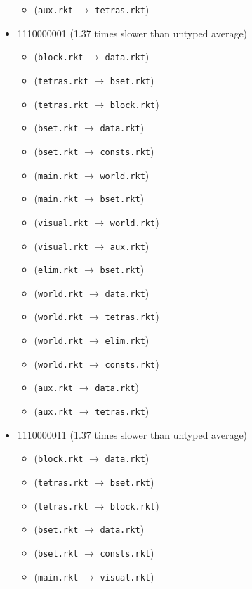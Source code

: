 \documentclass{article}
\newcommand{\mono}[1]{\texttt{#1}}
\begin{document}
\begin{itemize}
\begin{itemize}
  \item (\mono{aux.rkt} $\rightarrow$ \mono{tetras.rkt})
  \end{itemize}
\item 1110000001 (1.37 times slower than untyped average)
  \begin{itemize}
  \item (\mono{block.rkt} $\rightarrow$ \mono{data.rkt})
  \item (\mono{tetras.rkt} $\rightarrow$ \mono{bset.rkt})
  \item (\mono{tetras.rkt} $\rightarrow$ \mono{block.rkt})
  \item (\mono{bset.rkt} $\rightarrow$ \mono{data.rkt})
  \item (\mono{bset.rkt} $\rightarrow$ \mono{consts.rkt})
  \item (\mono{main.rkt} $\rightarrow$ \mono{world.rkt})
  \item (\mono{main.rkt} $\rightarrow$ \mono{bset.rkt})
  \item (\mono{visual.rkt} $\rightarrow$ \mono{world.rkt})
  \item (\mono{visual.rkt} $\rightarrow$ \mono{aux.rkt})
  \item (\mono{elim.rkt} $\rightarrow$ \mono{bset.rkt})
  \item (\mono{world.rkt} $\rightarrow$ \mono{data.rkt})
  \item (\mono{world.rkt} $\rightarrow$ \mono{tetras.rkt})
  \item (\mono{world.rkt} $\rightarrow$ \mono{elim.rkt})
  \item (\mono{world.rkt} $\rightarrow$ \mono{consts.rkt})
  \item (\mono{aux.rkt} $\rightarrow$ \mono{data.rkt})
  \item (\mono{aux.rkt} $\rightarrow$ \mono{tetras.rkt})
  \end{itemize}
\item 1110000011 (1.37 times slower than untyped average)
  \begin{itemize}
  \item (\mono{block.rkt} $\rightarrow$ \mono{data.rkt})
  \item (\mono{tetras.rkt} $\rightarrow$ \mono{bset.rkt})
  \item (\mono{tetras.rkt} $\rightarrow$ \mono{block.rkt})
  \item (\mono{bset.rkt} $\rightarrow$ \mono{data.rkt})
  \item (\mono{bset.rkt} $\rightarrow$ \mono{consts.rkt})
  \item (\mono{main.rkt} $\rightarrow$ \mono{visual.rkt})

\end{itemize}
\end{itemize}
\end{document}
